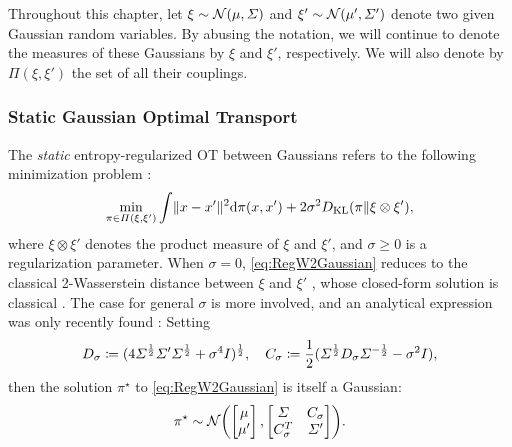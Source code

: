 Throughout this chapter, let $\xi \sim \mathcal{N}(\mu, \Sigma)$ and $\xi' \sim \mathcal{N}(\mu', \Sigma')$ denote two given Gaussian random variables. By abusing the notation, we will continue to denote the measures of these Gaussians by $\xi$ and $\xi'$, respectively. We will also denote by $\Pi(\xi,\xi')$ the set of all their couplings. 

\subsubsection{Static Gaussian Optimal Transport}
\label{sec:staticGOT}

The \emph{static} entropy-regularized \acrshort{OT} between Gaussians refers to the following minimization problem \citep{peyre2019computational}:
\begin{equation}
\label{eq:RegW2Gaussian}
\min_{\pi \in \Pi(\xi, \xi')} \int  \lVert x-x'\rVert^2  \mathrm{d} \pi(x, x') + 2\sigma^2 D_{\mathrm{KL}}(\pi \| \xi \otimes \xi'),
\end{equation}where $\xi\otimes\xi'$ denotes the product measure of $\xi$ and $\xi'$, and $\sigma \geq 0$ is a regularization parameter. When $\sigma = 0$, \eqref{eq:RegW2Gaussian} reduces to the classical 2-Wasserstein distance between $\xi$ and $\xi'$ \citep{villani2009optimal}, whose closed-form solution is classical \citep{dowson1982frechet, olkin1982distance}. The case for general $\sigma$ is more involved, and an analytical expression was only recently found \citep{bojilov2016matching, del2020statistical, janati2020entropic, mallasto2021entropy}: Setting%
\begin{equation}
\label{eq:Cstar}
D_\sigma \coloneqq ( 4\Sigma^{\frac{1}{2}} \Sigma' \Sigma^{\frac{1}{2}} + \sigma^4I  )^{\frac{1}{2}},\quad C_\sigma \coloneqq \frac{1}{2}(\Sigma^{\frac{1}{2}} D_\sigma \Sigma^{-\frac{1}{2}} - \sigma^2I),
\end{equation}
then the solution $\pi^\star$ to \eqref{eq:RegW2Gaussian} is itself a Gaussian:
\begin{align}
\label{eq:StaticGaussianSB-sol}
\pi^\star \sim \Ncal \parens*{  \begin{bmatrix}
\mu \\
\mu'
\end{bmatrix},  \begin{bmatrix}
\Sigma&C_\sigma\\
C_\sigma^T &\Sigma'
\end{bmatrix}}.
\end{align}

